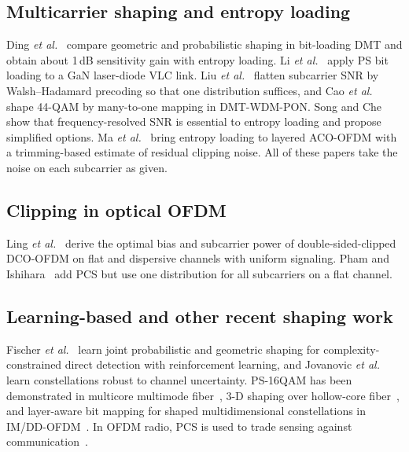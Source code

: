 \documentclass[conference]{IEEEtran}
\begin{document}
\subsection{Multicarrier shaping and entropy loading}
Ding \emph{et al.}~\cite{ding2020} compare geometric and probabilistic shaping in bit-loading DMT and obtain about 1\,dB sensitivity gain with entropy loading. Li \emph{et al.}~\cite{li2020} apply PS bit loading to a GaN laser-diode VLC link. Liu \emph{et al.}~\cite{liu2022} flatten subcarrier SNR by Walsh--Hadamard precoding so that one distribution suffices, and Cao \emph{et al.}~\cite{cao2020} shape 44-QAM by many-to-one mapping in DMT-WDM-PON. Song and Che~\cite{song2024} show that frequency-resolved SNR is essential to entropy loading and propose simplified options. Ma \emph{et al.}~\cite{ma2026} bring entropy loading to layered ACO-OFDM with a trimming-based estimate of residual clipping noise. All of these papers take the noise on each subcarrier as given.

\subsection{Clipping in optical OFDM}
Ling \emph{et al.}~\cite{ling2020} derive the optimal bias and subcarrier power of double-sided-clipped DCO-OFDM on flat and dispersive channels with uniform signaling. Pham and Ishihara~\cite{pham2026} add PCS but use one distribution for all subcarriers on a flat channel.

\subsection{Learning-based and other recent shaping work}
Fischer \emph{et al.}~\cite{fischer2026} learn joint probabilistic and geometric shaping for complexity-constrained direct detection with reinforcement learning, and Jovanovic \emph{et al.}~\cite{jovanovic2022} learn constellations robust to channel uncertainty. PS-16QAM has been demonstrated in multicore multimode fiber~\cite{guo2026}, 3-D shaping over hollow-core fiber~\cite{nli2026}, and layer-aware bit mapping for shaped multidimensional constellations in IM/DD-OFDM~\cite{wang2026}. In OFDM radio, PCS is used to trade sensing against communication~\cite{du2026,geiger2026}.
\end{document}
